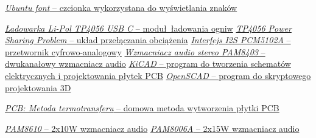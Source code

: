 \documentclass[polish]{aghengthesis}
\begin{document}
\begin{thebibliography}{9}
		\href{https://design.ubuntu.com/font}{\textit{Ubuntu font} -- czcionka wykorzystana do wyświetlania znaków}
		
		\href{https://botland.com.pl/moduly-ladowania-lipol-usb-micro-usb/16979-ladowarka-li-pol-tp4056-pojedyncza-cela-1s-37v-usb-typ-c-z-zabezpieczeniami--5904422326708.html}{\textit{Ładowarka Li-Pol TP4056 USB C} -- moduł ładowania ogniw}
		\href{https://www.best-microcontroller-projects.com/tp4056-page2.html}{\textit{TP4056 Power Sharing Problem} -- układ przełączania obciążenia}
		\href{https://www.aliexpress.com/item/1005002846127078.html}{\textit{Interfejs I2S PCM5102A} -- przetwornik cyfrowo-analogowy}
		\href{https://botland.com.pl/odtwarzacze-mp3-wav-ogg-midi/6641-wzmacniacz-audio-stereo-pam8403-5v-3w-dwukanalowy-zielony-5904422359850.html}{\textit{Wzmacniacz audio stereo PAM8403} -- dwukanałowy wzmacniacz audio}
		\href{https://www.kicad.org/}{\textit{KiCAD} -- program do tworzenia schematów elektrycznych i projektowania płytek PCB}
		\href{https://openscad.org/}{\textit{OpenSCAD} -- program do skryptowego projektowania 3D}
		
		\href{http://mikrokontrolery.blogspot.com/2011/03/wykonanie-plytki-pcb-metoda-termotransferu.html}{\textit{PCB: Metoda termotransferu} -- domowa metoda wytworzenia płytki PCB}
		
		\href{https://www.diodes.com/assets/Datasheets/products_inactive_data/PAM8610.pdf}{\textit{PAM8610} -- 2x10W wzmacniacz audio}
		\href{https://www.diodes.com/assets/Datasheets/PAM8006A.pdf}{\textit{PAM8006A} -- 2x15W wzmacniacz audio}
		
	\end{thebibliography}
	
\end{document}

